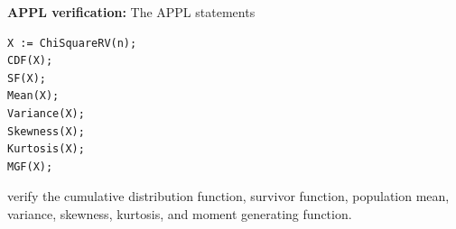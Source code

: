 \documentclass[12pt,fullpage]{article}
\begin{document}
\vspace{0.1in}

\noindent
{\bf APPL verification:}
The APPL statements
\begin{verbatim}
X := ChiSquareRV(n);
CDF(X);
SF(X);
Mean(X);
Variance(X);
Skewness(X);
Kurtosis(X);
MGF(X);
\end{verbatim}
verify the cumulative distribution function, survivor function,  population mean, variance, skewness, kurtosis, and moment generating function.
\end{document}
